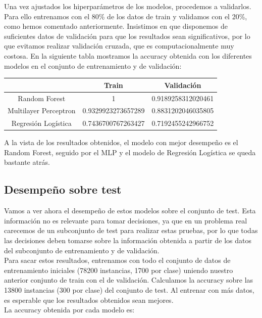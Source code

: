 \documentclass[a4]{article}
\begin{document}
Una vez ajustados los hiperparámetros de los modelos, procedemos a
validarlos. Para ello entrenamos con el 80\% de los datos de train y
validamos con el 20\%, como hemos comentado anteriormente. Insistimos
en que disponemos de suficientes datos de validación para que los
resultados sean significativos, por lo que evitamos realizar
validación cruzada, que es computacionalmente muy costosa. En la
siguiente tabla mostramos la accuracy obtenida con los diferentes
modelos en el conjunto de entrenamiento y de validación:

\begin{center}
\begin{tabular}{|c|c|c|}
  \hline
  \multicolumn{1}{|c|}{}& \textbf{Train} & \textbf{Validación}  \\ \hline
  Random Forest         & 1                  & 0.9189258312020461\\
  Multilayer Perceptron & 0.9329923273657289 & 0.8831202046035805 \\
  Regresión Logística   & 0.7436700767263427 & 0.7192455242966752 \\\hline
\end{tabular}
\end{center}

A la vista de los resultados obtenidos, el modelo con mejor desempeño
es el Random Forest, seguido por el MLP y el modelo de Regresión
Logística se queda bastante atrás.

\subsection{Desempeño sobre test}

Vamos a ver ahora el desempeño de estos modelos sobre el conjunto de
test. Esta información no es relevante para tomar decisiones, ya que
en un problema real carecemos de un subconjunto de test para realizar
estas pruebas, por lo que todas las decisiones deben tomarse sobre la
información obtenida a partir de los datos del subconjunto de
entrenamiento y de validación.\\ Para sacar estos resultados,
entrenamos con todo el conjunto de datos de entrenamiento iniciales
(78200 instancias, 1700 por clase) uniendo nuestro anterior conjunto
de train con el de validación. Calculamos la accuracy sobre las 13800
instancias (300 por clase) del conjunto de test. Al entrenar con más
datos, es esperable que los resultados obtenidos sean mejores.\\
La accuracy obtenida por cada modelo es:
\end{document}
